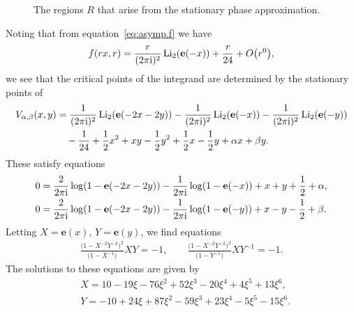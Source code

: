 \documentclass[pdftex]{sigma}
\numberwithin{equation}{section}
\def\Li{\mathrm{Li}}
\def\e{\mathbf e}
\def\Li{\operatorname{Li}}
\begin{document}
\begin{figure}[t]\centering
{}
\caption{The regions $R$ that arise from the stationary phase approximation.}\label{fig:R.regions}
\end{figure}
Noting that from equation~\eqref{eq:asymp.f} we have
\[
 f(rx,r) =\frac{r}{(2\pi {\rm i})^2}\Li_2(\e(-x))+\frac{r}{24}+O\bigl(r^0\bigr) ,
\]
we see that the critical points of the integrand are determined by the stationary points of
\begin{align}
 V_{\alpha,\beta}(x,y)&{}=\frac{1}{(2\pi {\rm i})^2}\Li_2(\e(-2x-2y))-\frac{1}{(2\pi {\rm i})^2}\Li_2(\e(-x))-\frac{1}{(2\pi {\rm i})^2}\Li_2(\e(-y))\nonumber\\
 &\quad{}-\frac{1}{24}+\frac{1}{2}x^2+xy-\frac{1}{2}y^2+\frac{1}{2}x-\frac{1}{2}y+\alpha x+\beta y .\label{eq:Vab}
\end{align}
These satisfy equations
\begin{align}
 &0 =\frac{2}{2\pi {\rm i}}\log(1-\e(-2x-2y))-\frac{1}{2\pi {\rm i}}\log(1-\e(-x))+x+y+\frac{1}{2}+\alpha ,\nonumber\\
 &0 =\frac{2}{2\pi {\rm i}}\log(1-\e(-2x-2y))-\frac{1}{2\pi {\rm i}}\log(1-\e(-y))+x-y-\frac{1}{2}+\beta .\label{eq.logstatphase}
\end{align}
Letting $X=\e(x)$, $Y=\e(y)$, we find equations
\begin{align}
 \frac{\bigl(1-X^{-2}Y^{-2}\bigr)^2}{\bigl(1-X^{-1}\bigr)}XY =-1 ,\qquad
\frac{\bigl(1-X^{-2}Y^{-2}\bigr)^2}{\bigl(1-Y^{-1}\bigr)}XY^{-1} =-1 .\label{eq:xysp}
\end{align}
The solutions to these equations are given by
\begin{align*}
 &X =10-19\xi-76\xi^2+52\xi^3-20\xi^4+4\xi^5+13\xi^6,\\
 &Y =-10+24\xi+87\xi^2-59\xi^3+23\xi^4-5\xi^5-15\xi^6 .
\end{align*}
\end{document}
